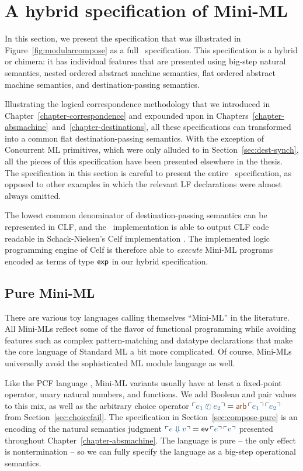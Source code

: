\chapter{A hybrid specification of Mini-ML}
\label{appendix-hybrid}

In this section, we present the specification that was illustrated in
Figure~\ref{fig:modularcompose} as a full \sls~specification. This
specification is a hybrid or chimera: it has individual features that
are presented using big-step natural semantics, nested ordered abstract
machine semantics, flat ordered abstract machine semantics, and
destination-passing semantics.

Illustrating the logical correspondence methodology that we introduced
in Chapter~\ref{chapter-correspondence} and expounded upon in
Chapters~\ref{chapter-absmachine}~and~\ref{chapter-destinations}, all
these specifications can transformed into a common flat
destination-passing semantics. With the exception of Concurrent ML
primitives, which were only alluded to in
Section~\ref{sec:dest-synch}, all the pieces of this specification
have been presented elsewhere in the thesis. The specification in this
section is careful to present the entire \sls~specification, as
opposed to other examples in which the relevant LF declarations were
almost always omitted.

The lowest common denominator of destination-passing semantics can be
represented in CLF, and the \sls~implementation is able to output CLF
code readable in Schack-Nielsen's Celf implementation
\cite{schacknielsen08celf}. The implemented logic programming engine
of Celf is therefore able to {\it execute} Mini-ML programs encoded as
terms of type ${\sf exp}$ in our hybrid specification.

\section{Pure Mini-ML}

There are various toy languages calling themselves ``Mini-ML'' in the
literature. All Mini-MLs reflect some of the flavor of functional
programming while avoiding features such as complex pattern-matching
and datatype declarations that make the core language of Standard ML
\cite{milner97definition} a bit more complicated.  Of course, Mini-MLs
universally avoid the sophisticated ML module language as well.

Like the PCF language \cite{plotkin77lcf}, Mini-ML variants usually
have at least a fixed-point operator, unary natural numbers, and
functions. We add Boolean and pair values to this mix, as well as the
arbitrary choice operator $\interp{e_1 \arb e_2} = \lf{{\sf
  arb}\,\interp{e_1}\,\interp{e_2}}$ from
Section~\ref{sec:choicefail}. The specification in
Section~\ref{sec:compose-pure} is an encoding of the natural semantics
judgment $\interp{e \Downarrow v} = {\sf ev}\,\interp{e}\,\interp{v}$
presented throughout Chapter~\ref{chapter-absmachine}. The language is
pure -- the only effect is nontermination -- so we can fully specify
the language as a big-step operational semantics.

